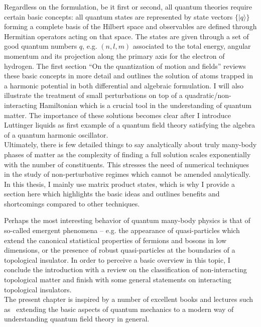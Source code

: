 Regardless on the formulation, be it first or second, all quantum theories require certain basic concepts:
all quantum states are represented by state vectors $\{|q\rangle\}$ forming a complete basis of the Hilbert space and observables are defined through Hermitian operators acting on that space.
The states are given through a set of good quantum numbers $q$, e.g. $(n,l,m)$ associated to the total energy, angular momentum and its projection along the primary axis for the electron of hydrogen.
The first section ``On the quantization of motion and fields'' reviews these basic concepts in more detail and outlines the solution of atoms trapped in a harmonic potential in both differential and algebraic formulation.
I will also illustrate the treatment of small perturbations on top of a quadratic/non-interacting Hamiltonian which is a crucial tool in the understanding of quantum matter.
The importance of these solutions becomes clear after I introduce Luttinger liquids as first example of a quantum field theory satisfying the algebra of a quantum harmonic oscillator.
\\

Ultimately, there is few detailed things to say analytically about truly many-body phases of matter as the complexity of finding a full solution scales exponentially with the number of constituents.
This stresses the need of numerical techniques in the study of non-perturbative regimes which cannot be amended analytically.
In this thesis, I mainly use matrix product states, which is why I provide a section here which highlights the basic ideas and outlines benefits and shortcomings compared to other techniques.

Perhaps the most interesting behavior of quantum many-body physics is that of so-called emergent phenomena -- e.g. the appearance of quasi-particles which extend the canonical statistical properties of fermions and bosons in low dimensions, or the presence of robust quasi-particles at the boundaries of a topological insulator.
In order to perceive a basic overview in this topic, I conclude the introduction with a review on the classification of non-interacting topological matter and finish with some general statements on interacting topological insulators.
\\

The present chapter is inspired by a number of excellent books and lectures such as~\cite{AshcroftMermin1978,AltlandSimons2010,BruusFlensberg2004,Czycholl2016,FetterWalecka2003,Giamarchi2003,Rizzi2016,Burrello2020} extending the basic aspects of quantum mechanics to a modern way of understanding quantum field theory in general.
%
%

